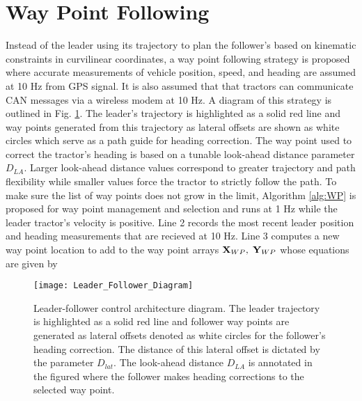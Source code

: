 \section{Way Point Following}\label{s:Way_Point_Following}
Instead of the leader using its trajectory to plan the follower's based on kinematic constraints in curvilinear coordinates, a way point following strategy is proposed where accurate measurements of vehicle position, speed, and heading are assumed at 10 Hz from GPS signal. It is also assumed that that tractors can communicate CAN messages via a wireless modem at 10 Hz. A diagram of this strategy is outlined in Fig. \ref{fig:Leader_Follower_Diagram}. The leader's trajectory is highlighted as a solid red line and way points generated from this trajectory as lateral offsets are shown as white circles which serve as a path guide for heading correction. The way point used to correct the tractor's heading is based on a tunable look-ahead distance parameter $D_{LA}$. Larger look-ahead distance values correspond to greater trajectory and path flexibility while smaller values force the tractor to strictly follow the path. To make sure the list of way points does not grow in the limit, Algorithm \ref{alg:WP} is proposed for way point management and selection and runs at 1 Hz while the leader tractor's velocity is positive. Line 2 records the most recent leader position and heading measurements that are recieved at 10 Hz. Line 3 computes a new way point location to add to the way point arrays $\mathbf{X}_{WP},\hspace{1mm}\mathbf{Y}_{WP}$ whose equations are given by 
\begin{figure}[h]
    \centering
    \texttt{[image: Leader\_Follower\_Diagram]}
    \caption{Leader-follower control architecture diagram. The leader trajectory is highlighted as a solid red line and follower way points are generated as lateral offsets denoted as white circles for the follower's heading correction. The distance of this lateral offset is dictated by the parameter $D_{lat}$. The look-ahead distance $D_{LA}$ is annotated in the figured where the follower makes heading corrections to the selected way point.}
    \label{fig:Leader_Follower_Diagram}
\end{figure}
